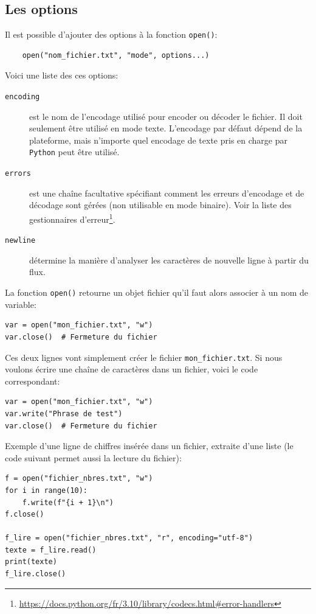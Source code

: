 \documentclass[a4paper,12pt]{book}
\begin{document}
\subsection*{Les options}
Il est possible d'ajouter des options à la fonction \texttt{open()}:
\begin{verbatim}
    open("nom_fichier.txt", "mode", options...)
\end{verbatim}
\medskip

Voici une liste des ces options:
\begin{description}
    \item[\texttt{encoding}] est le nom de l'encodage utilisé pour encoder ou décoder le fichier. Il doit seulement être utilisé en mode texte. L'encodage par défaut dépend de la plateforme, mais n'importe quel encodage de texte pris en charge par \texttt{Python} peut être utilisé.
    \item[\texttt{errors}] est une chaîne facultative spécifiant comment les erreurs d'encodage et de décodage sont gérées (non utilisable en mode binaire). Voir la liste des gestionnaires d'erreur\footnote{\url{https://docs.python.org/fr/3.10/library/codecs.html\#error-handlers}}.
    \item[\texttt{newline}] détermine la manière d'analyser les caractères de nouvelle ligne à partir du flux.
\end{description}
\medskip

La fonction \texttt{open()} retourne un objet fichier qu'il faut alors associer à un nom de variable:
\begin{lstlisting}
var = open("mon_fichier.txt", "w")
var.close()  # Fermeture du fichier
\end{lstlisting}
\medskip

Ces deux lignes vont simplement créer le fichier \texttt{mon\_fichier.txt}. Si nous voulons écrire une chaîne de caractères dans un fichier, voici le code correspondant:
 \begin{lstlisting}
var = open("mon_fichier.txt", "w")
var.write("Phrase de test")
var.close()  # Fermeture du fichier
\end{lstlisting}
\medskip

Exemple d'une ligne de chiffres insérée dans un fichier, extraite d'une liste (le code suivant permet aussi la lecture du fichier):
\begin{lstlisting}
f = open("fichier_nbres.txt", "w")
for i in range(10):
    f.write(f"{i + 1}\n")
f.close()

f_lire = open("fichier_nbres.txt", "r", encoding="utf-8")
texte = f_lire.read()
print(texte)
f_lire.close()
\end{lstlisting}
\medskip
\end{document}
